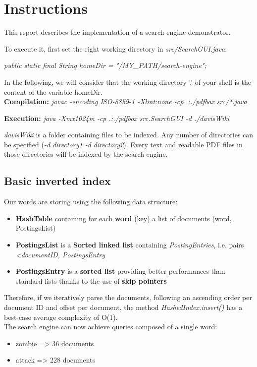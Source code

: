 \section*{Instructions}
This report describes the implementation of a search engine demonstrator.

To execute it, first set the right working directory in \textit{src/SearchGUI.java}:

\textit{public static final String homeDir = "/MY\_PATH/search-engine";}

In the following, we will consider that the working directory '.'  of your shell is the content of the variable homeDir.
\\

\textbf{Compilation:}
\textit{javac -encoding ISO-8859-1 -Xlint:none -cp .:./pdfbox src/*.java}

\textbf{Execution:}
\textit{java -Xmx1024m -cp .:./pdfbox src.SearchGUI -d ./davisWiki}

\textit{davisWiki} is a folder containing files to be indexed. Any number of directories can be specified (\textit{-d directory1 -d directory2}). Every text and readable PDF files in those directories will be indexed by the search engine.

\setcounter{section}{1}
\subsection{Basic inverted index}
Our words are storing using the following data structure:
\begin{itemize}
\item \textbf{HashTable} containing for each \textbf{word} (key) a list of documents (word, PostingsList)
\item \textbf{PostingsList} is a \textbf{Sorted linked list} containing \textit{PostingEntries}, i.e. pairs \textit{<documentID, PostingsEntry}
\item \textbf{PostingsEntry} is a \textbf{sorted list} providing better performances than standard lists thanks to the use of \textbf{skip pointers}
\end{itemize}

Therefore, if we iteratively parse the documents, following an ascending order per document ID and offset per document, the method \textit{HashedIndex.insert()} has a best-case average complexity of O(1).
\\

The search engine can now achieve queries composed of a single word:
\begin{itemize}
\item zombie => 36 documents
\item attack => 228 documents
\end{itemize}
\pagebreak


